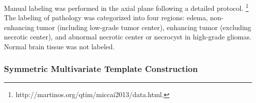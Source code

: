 \documentclass[final,5p,times,twocolumn]{elsarticle}
\begin{document}
Manual labeling was performed in the axial plane following a detailed
protocol.%
\footnote{
http://martinos.org/qtim/miccai2013/data.html.
}
The labeling of pathology was categorized into four regions:
edema, non-enhancing tumor (including low-grade tumor center), 
enhancing tumor (excluding necrotic center), and abnormal
necrotic center or necrocyst in high-grade gliomas.
Normal brain tissue was not labeled. 

% 
%






\subsubsection{Symmetric Multivariate Template Construction}
\end{document}
